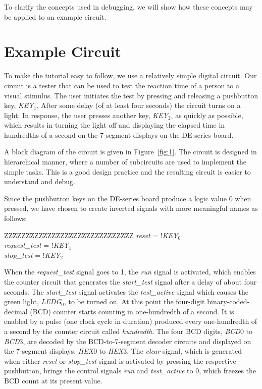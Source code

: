 \documentclass[11pt, twoside, pdftex]{article}
\begin{document}
To clarify the concepts used in debugging, we will show how these concepts may be
applied to an example circuit.
 
\section{Example Circuit}
To make the tutorial easy to follow, we use a relatively simple digital circuit.
Our circuit is a tester that can be used to test the reaction time of a person
to a visual stimulus. The user initiates the test by pressing and releasing a pushbutton key, 
{\it KEY}$_1$. After some delay (of at least four seconds) the circuit turns on a light. 
In response, the user presses another key, {\it KEY}$_2$, as quickly as possible, which 
results in turning the light off and displaying the elapsed time in
hundredths of a second on the 7-segment displays on the DE-series board.

A block diagram of the circuit is given in Figure~\ref{fig:1}. The circuit is designed in
hierarchical manner, where a number of subcircuits are used to implement the simple tasks.
This is a good design practice and the resulting circuit is easier to understand and debug.

Since the pushbutton keys on the DE-series board produce a logic value 0 when pressed, 
we have chosen to create inverted signals with more meaningful names as follows:
\begin{center} %
\parbox{12.5cm}{
\begin{tabbing}
ZZ\=ZZZZ\=ZZZZZZ\=ZZZZZZZZZZZZZZZZ\=ZZ\kill
{\it reset} = !{\it KEY}$_0$\\
{\it request\_test} = !{\it KEY}$_1$ \\
{\it stop\_test} = !{\it KEY}$_2$
\end{tabbing} } %
\end{center}


\noindent
When the {\it request\_test} signal goes to 1, the {\it run} signal is activated,
which enables the counter circuit that generates the {\it start\_test} signal
after a delay of about four seconds. The {\it start\_test} signal activates the
{\it test\_active} signal which causes the green light, {\it LEDG}$_0$, 
to be turned on. At this point the four-digit binary-coded-decimal (BCD) counter
starts counting in one-hundredth of a second. It is enabled by a pulse (one clock 
cycle in duration) produced every one-hundredth of a second by the counter circuit
called {\it hundredth}. The four BCD digits, {\it BCD}0 to {\it BCD}3, are 
decoded by the BCD-to-7-segment decoder circuits and displayed on the 7-segment 
displays, {\it HEX}0 to {\it HEX}3. The {\it clear} signal, which is generated when 
either {\it reset} or {\it stop\_test} signal is activated by pressing the respective 
pushbutton, brings the control signals {\it run} and {\it test\_active} to 0, 
which freezes the BCD count at its present value.
\end{document}
